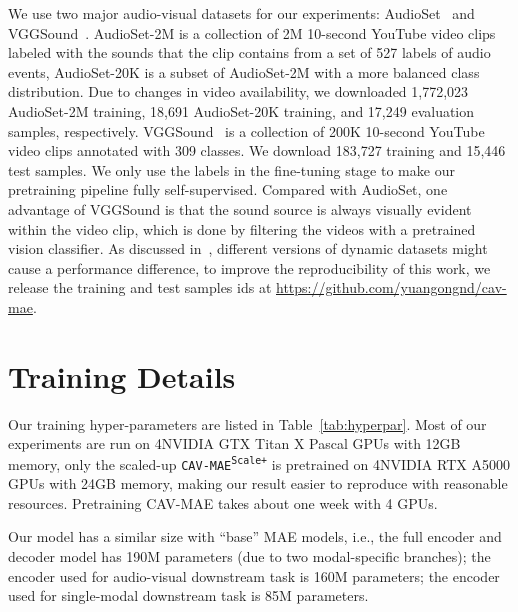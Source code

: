 \documentclass{article} \usepackage{iclr2023_conference,times}
\begin{document}
We use two major audio-visual datasets for our experiments: AudioSet~\cite{gemmeke2017audio} and VGGSound~\cite{chen2020vggsound}. AudioSet-2M is a collection of 2M 10-second YouTube video clips labeled with the sounds that the clip contains from a set of 527 labels of audio events, AudioSet-20K is a subset of AudioSet-2M with a more balanced class distribution. Due to changes in video availability, we downloaded 1,772,023 AudioSet-2M training, 18,691 AudioSet-20K training, and 17,249 evaluation samples, respectively. VGGSound~\cite{chen2020vggsound} is a collection of 200K 10-second YouTube video clips annotated with 309 classes. We download 183,727 training and 15,446 test samples. We only use the labels in the fine-tuning stage to make our pretraining pipeline fully self-supervised. Compared with AudioSet, one advantage of VGGSound is that the sound source is always visually evident within the video clip, which is done by filtering the videos with a pretrained vision classifier. As discussed in~\cite{li22f_interspeech}, different versions of dynamic datasets might cause a performance difference, to improve the reproducibility of this work, we release the training and test samples ids at \url{https://github.com/yuangongnd/cav-mae}.

\section{Training Details}
\label{sec:tr_details}

Our training hyper-parameters are listed in Table~\ref{tab:hyperpar}. Most of our experiments are run on 4NVIDIA GTX Titan X Pascal GPUs with 12GB memory, only the scaled-up \texttt{CAV-MAE\textsuperscript{Scale+}} is pretrained on 4NVIDIA RTX A5000 GPUs with 24GB memory, making our result easier to reproduce with reasonable resources. Pretraining CAV-MAE takes about one week with 4 GPUs.

Our model has a similar size with ``base'' MAE models, i.e., the full encoder and decoder model has 190M parameters (due to two modal-specific branches); the encoder used for audio-visual downstream task is 160M parameters; the encoder used for single-modal downstream task is 85M parameters.
\end{document}
